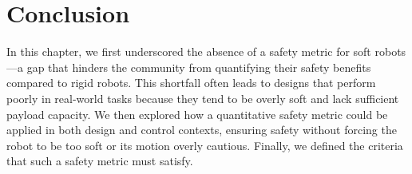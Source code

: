 \section{Conclusion}
In this chapter, we first underscored the absence of a safety metric for soft robots—a gap that hinders the community from quantifying their safety benefits compared to rigid robots. This shortfall often leads to designs that perform poorly in real-world tasks because they tend to be overly soft and lack sufficient payload capacity. We then explored how a quantitative safety metric could be applied in both design and control contexts, ensuring safety without forcing the robot to be too soft or its motion overly cautious. Finally, we defined the criteria that such a safety metric must satisfy.

